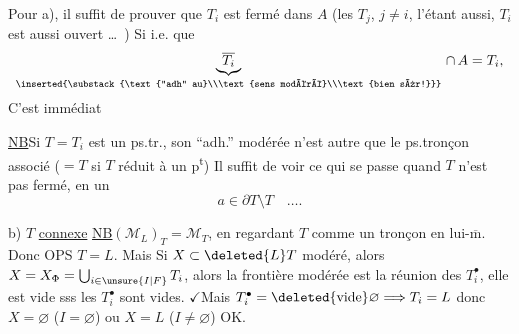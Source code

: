 Pour a), il suffit de prouver que $T_i$ est fermé dans  $A$ (les $T_j$, $j\ne i$, l'étant aussi, $T_i$ est aussi ouvert \ldots\ ) Si  i.e. que
\[
\underbrace{\overline{T_i}}_{\inserted{\substack{\text{``adh'' au}\\\text{sens modéré}\\\text{bien sûr!}}}}\,\cap\, A=T_{i},
\]
C'est immédiat

\uline{NB}\qquad Si $T=T_i$ est un ps.tr., son ``adh.'' modérée n'est autre que le ps.tronçon  associé ($=T$ si $T$ réduit à un p\textsuperscript{t}) Il suffit de voir ce qui se passe quand $T$ n'est pas fermé, en un   
\[
a\in\partial T\setminus T\quad\ldots.
\]

b) $T$ \uline{connexe}\quad {} \uline{NB}\quad $(\mathcal M_{L})_T=\mathcal M_T$,
en regardant $T$ comme un tronçon en lui-$\overline{\text{m}}$.  Donc OPS $T=L$. Mais Si $X\subset\deleted{L}T$ modéré,
alors \unsure{:}  $X=X_{\Phi}=\bigcup_{i\in\unsure{I|F}}T_i$, alors  la frontière modérée est la réunion des \deleted{$\unsure{\partial}$} $T_i^\bullet$,
elle est vide sss les $T_i^\bullet$ sont vides. $\checkmark$Mais $T_i^\bullet=\deleted{\text{vide}}\varnothing\Longrightarrow T_i=L$ donc $X=\varnothing$ ($I=\varnothing$) ou $X=L$ ($I\ne\varnothing$) OK.

